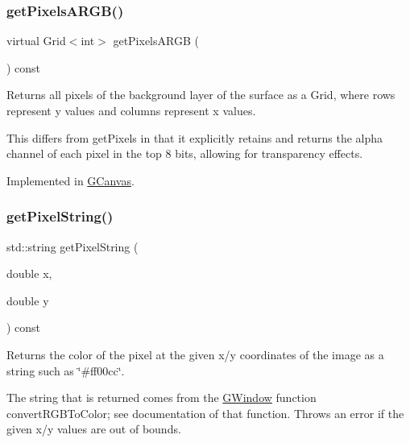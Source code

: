 \subsubsection{\texorpdfstring{get\+Pixels\+A\+R\+G\+B()}{getPixelsARGB()}}
{\footnotesize\ttfamily virtual Grid$<$int$>$ get\+Pixels\+A\+R\+GB (\begin{DoxyParamCaption}{ }\end{DoxyParamCaption}) const\hspace{0.3cm}{\ttfamily [pure virtual]}}



Returns all pixels of the background layer of the surface as a Grid, where rows represent y values and columns represent x values. 

This differs from get\+Pixels in that it explicitly retains and returns the alpha channel of each pixel in the top 8 bits, allowing for transparency effects. 

Implemented in \mbox{\hyperlink{classGCanvas_aa1626b73d6dae452e9e78c159411058b}{G\+Canvas}}.

\mbox{\label{classGDrawingSurface_a8da04ef488ec5fa498fbbffaf50928fd}} 
\subsubsection{\texorpdfstring{get\+Pixel\+String()}{getPixelString()}}
{\footnotesize\ttfamily std\+::string get\+Pixel\+String (\begin{DoxyParamCaption}\item[{double}]{x,  }\item[{double}]{y }\end{DoxyParamCaption}) const\hspace{0.3cm}{\ttfamily [virtual]}}



Returns the color of the pixel at the given x/y coordinates of the image as a string such as \char`\"{}\#ff00cc\char`\"{}. 

The string that is returned comes from the {\ttfamily \mbox{\hyperlink{classGWindow}{G\+Window}}} function {\ttfamily convert\+R\+G\+B\+To\+Color}; see documentation of that function. Throws an error if the given x/y values are out of bounds. \mbox{\label{classGDrawingSurface_a9e983467cf0c97cfd62433a8471570dc}} 
